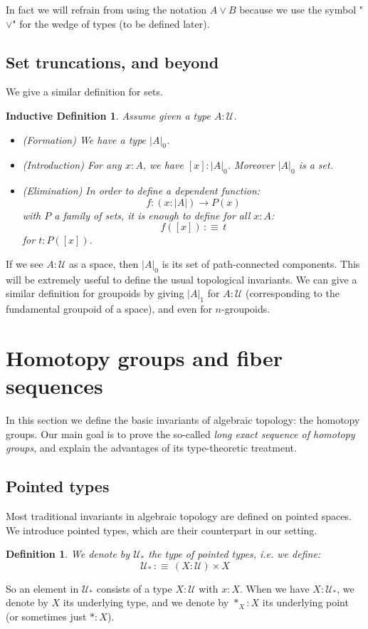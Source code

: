 \documentclass{article}
\newcommand{\se}[1]{\medbreak \medbreak \section{#1}}
\newcommand{\sse}[1]{\medbreak \subsection{#1}}
\newcommand{\U}{{\mathcal U}}
\renewcommand{\r}{\rightarrow}
\newtheorem{definition}{Definition}
\newtheorem{remark}{Remark}
\newtheorem{ind_def}{Inductive Definition}
\begin{document}
In fact we will refrain from using the notation $A\lor B$ because we use the symbol "$\lor$" for the wedge of types (to be defined later).

\sse{Set truncations, and beyond}

We give a similar definition for sets.

\begin{ind_def}
Assume given a type $A:\U$.
\begin{itemize}
\item (Formation) We have a type $|A|_0$.
\item (Introduction) For any $x:A$, we have $[x]:|A|_0$. Moreover $|A|_0$ is a set.
\item (Elimination) In order to define a dependent function: 
\[f:(x:|A|) \r P(x)\]
with $P$ a family of sets, it is enough to define for all $x:A$:
\[f([x])\, :\equiv \, t\]
for $t:P([x])$.
\end{itemize}
\end{ind_def}

If we see $A:\U$ as a space, then $|A|_0$ is its set of path-connected components. This will be extremely useful to define the usual topological invariants. We can give a similar definition for groupoids by giving $|A|_1$ for $A:\U$ (corresponding to the fundamental groupoid of a space), and even for $n$-groupoids.







\se{Homotopy groups and fiber sequences}

In this section we define the basic invariants of algebraic topology: the homotopy groups. Our main goal is to prove the so-called \emph{long exact sequence of homotopy groups}, and explain the advantages of its type-theoretic treatment.%


\sse{Pointed types}

Most traditional invariants in algebraic topology are defined on pointed spaces. We introduce pointed types, which are their counterpart in our setting.

\begin{definition}
We denote by $\U_*$ the type of pointed types, i.e. we define:
\[\U_* \, :\equiv\, (X:\U)\times X\]
\end{definition}

So an element in $\U_*$ consists of a type $X:\U$ with $x:X$. When we have $X:\U_*$, we denote by $X$ its underlying type, and we denote by $*_X:X$ its underlying point (or sometimes just $*:X$).
\end{document}
